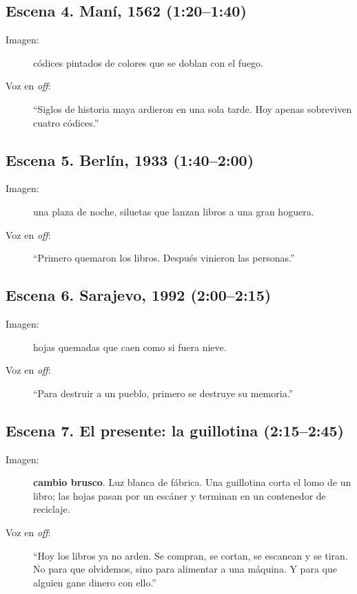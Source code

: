 \subsection*{Escena 4. Maní, 1562 (1:20--1:40)}
\begin{description}
  \item[Imagen:] códices pintados de colores que se doblan con el fuego.
  \item[Voz en \textit{off}:] ``Siglos de historia maya ardieron en una sola
        tarde. Hoy apenas sobreviven cuatro códices.''
\end{description}

\subsection*{Escena 5. Berlín, 1933 (1:40--2:00)}
\begin{description}
  \item[Imagen:] una plaza de noche, siluetas que lanzan libros a una gran hoguera.
  \item[Voz en \textit{off}:] ``Primero quemaron los libros. Después vinieron
        las personas.''
\end{description}

\subsection*{Escena 6. Sarajevo, 1992 (2:00--2:15)}
\begin{description}
  \item[Imagen:] hojas quemadas que caen como si fuera nieve.
  \item[Voz en \textit{off}:] ``Para destruir a un pueblo, primero se destruye
        su memoria.''
\end{description}

\subsection*{Escena 7. El presente: la guillotina (2:15--2:45)}
\begin{description}
  \item[Imagen:] \textbf{cambio brusco}. Luz blanca de fábrica. Una guillotina
        corta el lomo de un libro; las hojas pasan por un escáner y terminan en
        un contenedor de reciclaje.
  \item[Voz en \textit{off}:] ``Hoy los libros ya no arden. Se compran, se cortan,
        se escanean y se tiran. No para que olvidemos, sino para alimentar a una
        máquina. Y para que alguien gane dinero con ello.''
\end{description}

